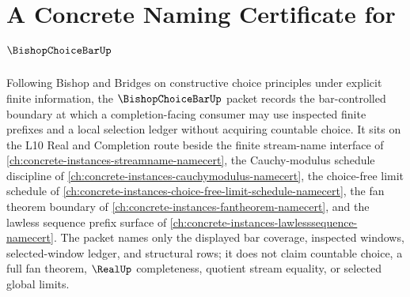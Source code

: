 \chapter{A Concrete Naming Certificate for $\BishopChoiceBarUp$}
\label{ch:concrete-instances-bishop-choice-bar-namecert}

Following Bishop and Bridges on constructive choice principles under explicit finite information, the $\BishopChoiceBarUp$ packet records the bar-controlled boundary at which a completion-facing consumer may use inspected finite prefixes and a local selection ledger without acquiring countable choice. It sits on the L10 Real and Completion route beside the finite stream-name interface of \autoref{ch:concrete-instances-streamname-namecert}, the Cauchy-modulus schedule discipline of \autoref{ch:concrete-instances-cauchymodulus-namecert}, the choice-free limit schedule of \autoref{ch:concrete-instances-choice-free-limit-schedule-namecert}, the fan theorem boundary of \autoref{ch:concrete-instances-fantheorem-namecert}, and the lawless sequence prefix surface of \autoref{ch:concrete-instances-lawlesssequence-namecert}. The packet names only the displayed bar coverage, inspected windows, selected-window ledger, and structural rows; it does not claim countable choice, a full fan theorem, $\RealUp$ completeness, quotient stream equality, or selected global limits.


